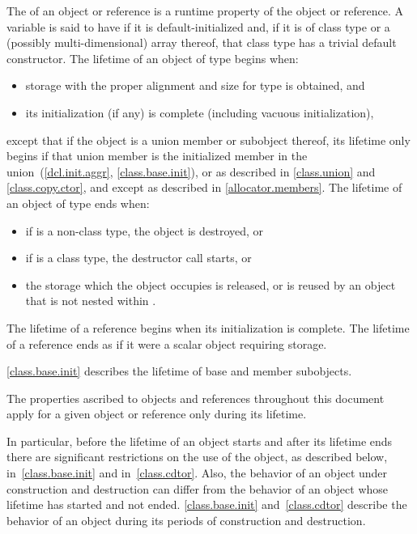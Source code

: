 \pnum
{}%
The  of an object or reference is a runtime property of the
object or reference.
A variable is said to have 
if it is default-initialized and,
if it is of class type or a (possibly multi-dimensional) array thereof,
that class type has a trivial default constructor.
The lifetime of an object of type  begins when:
\begin{itemize}
\item storage with the proper alignment and size
  for type  is obtained, and
\item its initialization (if any) is complete
  (including vacuous initialization),
\end{itemize}
except that if the object is a union member or subobject thereof,
its lifetime only begins if that union member is the
initialized member in the union~(\ref{dcl.init.aggr}, \ref{class.base.init}),
or as described in \ref{class.union} and \ref{class.copy.ctor},
and except as described in \ref{allocator.members}.
The lifetime of an object  of type  ends when:
\begin{itemize}
\item if  is a non-class type, the object is destroyed, or
\item if  is a class type, the destructor call starts, or
\item the storage which the object occupies is released,
or is reused by an object that is not nested within .
\end{itemize}

\pnum
{}%
The lifetime of a reference begins when its initialization is complete.
The lifetime of a reference ends as if it were a scalar object requiring storage.

\pnum
\begin{note}
\ref{class.base.init}
describes the lifetime of base and member subobjects.
\end{note}

\pnum
The properties ascribed to objects and references throughout this document
apply for a given object or reference only during its lifetime.
\begin{note}
In particular, before the lifetime of an object starts and after its
lifetime ends there are significant restrictions on the use of the
object, as described below, in~\ref{class.base.init} and
in~\ref{class.cdtor}. Also, the behavior of an object under construction
and destruction can differ from the behavior of an object whose
lifetime has started and not ended. \ref{class.base.init}
and~\ref{class.cdtor} describe the behavior of an object during its periods
of construction and destruction.
\end{note}

